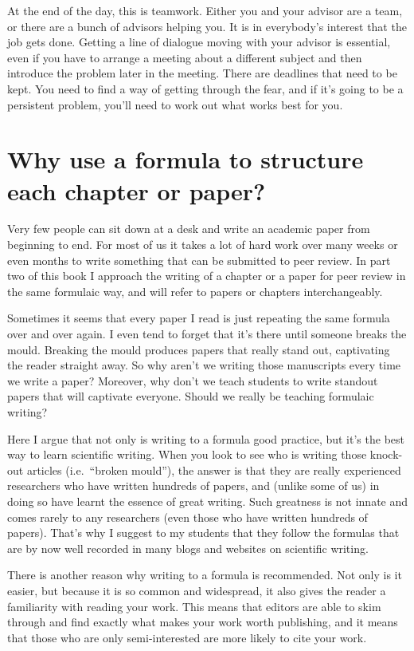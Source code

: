 \documentclass[
]{krantz}
\begin{document}
At the end of the day, this is teamwork. Either you and your advisor are a team, or there are a bunch of advisors helping you. It is in everybody's interest that the job gets done. Getting a line of dialogue moving with your advisor is essential, even if you have to arrange a meeting about a different subject and then introduce the problem later in the meeting. There are deadlines that need to be kept. You need to find a way of getting through the fear, and if it's going to be a persistent problem, you'll need to work out what works best for you.

\hypertarget{formula}{%
\section{Why use a formula to structure each chapter or paper?}\label{formula}}

Very few people can sit down at a desk and write an academic paper from beginning to end. For most of us it takes a lot of hard work over many weeks or even months to write something that can be submitted to peer review. In part two of this book I approach the writing of a chapter or a paper for peer review in the same formulaic way, and will refer to papers or chapters interchangeably.

Sometimes it seems that every paper I read is just repeating the same formula over and over again. I even tend to forget that it's there until someone breaks the mould. Breaking the mould produces papers that really stand out, captivating the reader straight away. So why aren't we writing those manuscripts every time we write a paper? Moreover, why don't we teach students to write standout papers that will captivate everyone. Should we really be teaching formulaic writing?

Here I argue that not only is writing to a formula good practice, but it's the best way to learn scientific writing. When you look to see who is writing those knock-out articles (i.e.~``broken mould''), the answer is that they are really experienced researchers who have written hundreds of papers, and (unlike some of us) in doing so have learnt the essence of great writing. Such greatness is not innate and comes rarely to any researchers (even those who have written hundreds of papers). That's why I suggest to my students that they follow the formulas that are by now well recorded in many blogs and websites on scientific writing.

There is another reason why writing to a formula is recommended. Not only is it easier, but because it is so common and widespread, it also gives the reader a familiarity with reading your work. This means that editors are able to skim through and find exactly what makes your work worth publishing, and it means that those who are only semi-interested are more likely to cite your work.
\end{document}

